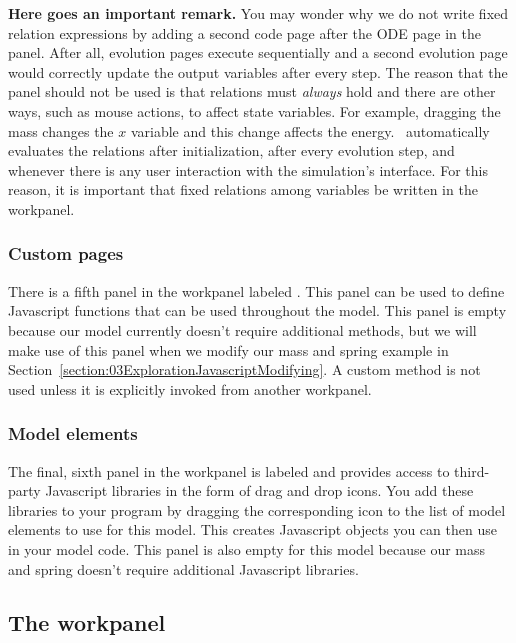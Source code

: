 \noindent \textbf{Here goes an important remark.} You may wonder why we do not write fixed relation expressions by adding a second code page after the ODE page in the
 panel. After all, evolution pages execute sequentially and a second evolution page would correctly
update the output variables after every step. The reason that the  panel should not be used is that
relations must \emph{always} hold and there are other ways, such as mouse actions, to affect state
variables. For example, dragging the mass changes the $x$ variable and this change affects the energy.
\ejs\ automatically evaluates the relations after initialization, after every evolution step, and whenever
there is any user interaction with the simulation's interface.  For this reason, it is important that fixed relations among variables be written in the  workpanel.

\subsubsection{Custom pages}

There is a fifth panel in the  workpanel labeled . This panel can be used to define Javascript functions that can be used throughout the model.  This panel is empty because our model currently doesn't require additional methods,
but we will make use of this panel when we modify our mass and spring example in Section~\ref{section:03ExplorationJavascriptModifying}.  A
custom method is not used unless it is explicitly invoked from another workpanel.

\subsubsection{Model elements}

The final, sixth panel in the  workpanel is labeled  and provides access to third-party Javascript libraries in the form of drag and drop icons. You add these libraries to your program by dragging the corresponding icon to the list of model elements to use for this model. This creates Javascript objects you can then use in your model code. This panel is also empty for this model because our mass and spring doesn't require additional Javascript libraries.

\subsection{The  workpanel}

